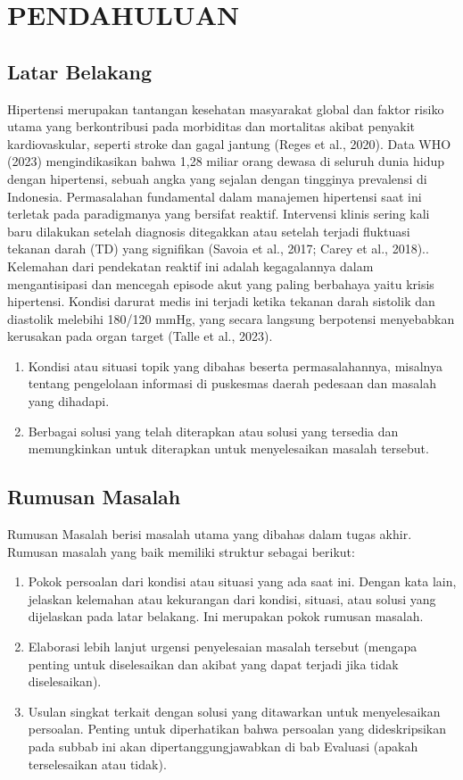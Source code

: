 \chapter{PENDAHULUAN}
\label{chap:pendahuluan}
\section{Latar Belakang}
Hipertensi merupakan tantangan kesehatan masyarakat global dan faktor risiko utama yang berkontribusi pada morbiditas dan mortalitas akibat penyakit kardiovaskular, seperti stroke dan gagal jantung (Reges et al., 2020). Data WHO (2023) mengindikasikan bahwa 1,28 miliar orang dewasa di seluruh dunia hidup dengan hipertensi, sebuah angka yang sejalan dengan tingginya prevalensi di Indonesia. Permasalahan fundamental dalam manajemen hipertensi saat ini terletak pada paradigmanya yang bersifat reaktif. Intervensi klinis sering kali baru dilakukan setelah diagnosis ditegakkan atau setelah terjadi fluktuasi tekanan darah (TD) yang signifikan (Savoia et al., 2017; Carey et al., 2018).. Kelemahan dari pendekatan reaktif ini adalah kegagalannya dalam mengantisipasi dan mencegah episode akut yang paling berbahaya yaitu krisis hipertensi. Kondisi darurat medis ini terjadi ketika tekanan darah sistolik dan diastolik melebihi 180/120 mmHg, yang secara langsung berpotensi menyebabkan kerusakan pada organ target (Talle et al., 2023).
\begin{enumerate}
\item	Kondisi atau situasi topik yang dibahas beserta permasalahannya, misalnya tentang pengelolaan informasi di puskesmas daerah pedesaan dan masalah yang dihadapi.
\item	Berbagai solusi yang telah diterapkan atau solusi yang tersedia dan memungkinkan untuk diterapkan untuk menyelesaikan masalah tersebut.
\end{enumerate}

\section{Rumusan Masalah}
Rumusan Masalah berisi masalah utama yang dibahas dalam tugas akhir. Rumusan masalah yang baik memiliki struktur sebagai berikut:
\begin{enumerate}
\item	Pokok persoalan dari kondisi atau situasi yang ada saat ini. Dengan kata lain, jelaskan kelemahan atau kekurangan dari kondisi, situasi, atau solusi yang dijelaskan pada latar belakang. Ini merupakan pokok rumusan masalah.
\item	Elaborasi lebih lanjut urgensi penyelesaian masalah tersebut (mengapa penting untuk diselesaikan dan akibat yang dapat terjadi jika tidak diselesaikan).
\item	Usulan singkat terkait dengan solusi yang ditawarkan untuk menyelesaikan persoalan.
Penting untuk diperhatikan bahwa persoalan yang dideskripsikan pada subbab ini akan dipertanggungjawabkan di bab Evaluasi (apakah terselesaikan atau tidak).
\end{enumerate}

